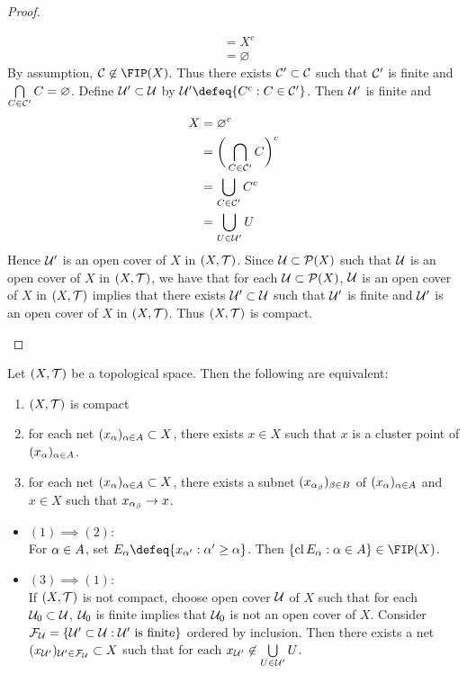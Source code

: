 \documentclass{book}
\begin{document}
\begin{proof}
\begin{itemize}
\begin{align*}
				& = X^c \\
				& = \varnothing
			\end{align*}  
			By assumption, $\MC \not \in \FIP(X)$. Thus there exists $\mathcal{C}' \subset \mathcal{C}$ such that $\mathcal{C}'$ is finite and $\bigcap\limits_{C \in \mathcal{C}'} C = \varnothing$. Define $\mathcal{U}' \subset \mathcal{U}$ by $\MU' \defeq \{C^c: C \in \MC' \}$. Then $\mathcal{U}'$ is finite and 
			\begin{align*}
				X
				& = \varnothing^c \\
				& = \bigg( \bigcap_{C \in \mathcal{C}'} C \bigg)^c \\
				& = \bigcup_{C \in \mathcal{C}'} C^c \\
				& = \bigcup_{U \in \mathcal{U}'} U \\
			\end{align*}
			Hence $\mathcal{U}'$ is an open cover of $X$ in $(X, \mathcal{T})$. Since $\mathcal{U} \subset \mathcal{P}(X)$ such that $\mathcal{U}$ is an open cover of $X$ in $(X, \mathcal{T})$, we have that for each $\mathcal{U} \subset \mathcal{P}(X)$, $\mathcal{U}$ is an open cover of $X$ in $(X, \mathcal{T})$ implies that there exists $\mathcal{U}' \subset \mathcal{U}$ such that $\mathcal{U}'$ is finite and $\mathcal{U}'$ is an open cover of $X$ in $(X, \mathcal{T})$. Thus $(X, \mathcal{T})$ is compact. 
			\end{itemize}
	\end{proof}

	\begin{ex} 
		Let $(X, \mathcal{T})$ be a topological space. Then the following are equivalent:
		\begin{enumerate}
			\item $(X, \mathcal{T})$ is compact
			\item for each net $(x_{\alpha})_{\alpha \in A} \subset X$, there exists $x \in X$ such that $x$ is a cluster point of $(x_{\alpha})_{\alpha \in A}$.
			\item for each net $(x_{\alpha})_{\alpha \in A} \subset X$, there exists a subnet $(x_{\alpha_{\beta}})_{\beta \in B}$ of $(x_{\alpha})_{\alpha \in A}$ and $x \in X$ such that $x_{\alpha_{\beta}} \rightarrow x$. \\
		\end{enumerate} 
		\begin{itemize}
			\item $(1) \implies (2)$: \\
			For $\alpha \in A$, set $E_{\al} \defeq \{x_{\al'}: \al' \geq \al \}$. Then $\{\cl E_{\al}: \al \in A\} \in \FIP(X)$.  
			\item $(3) \implies (1)$: \\
			If $(X, \mathcal{T})$ is not compact, choose open cover $\mathcal{U}$ of $X$ such that for each $\mathcal{U}_0 \subset \mathcal{U}$, $\mathcal{U}_0$ is finite implies that $\mathcal{U}_0$ is not an open cover of $X$. Consider $\mathcal{F}_{\mathcal{U}} = \{\mathcal{U}' \subset \mathcal{U}: \mathcal{U}' \text{ is finite}\}$ ordered by inclusion. Then there exists a net $(x_{\mathcal{U}'})_{\mathcal{U}' \in \mathcal{F}_{\mathcal{U}}} \subset X$ such that for each $x_{\mathcal{U}'} \not \in  \bigcup\limits_{U \in \mathcal{U}'} U$. 
		\end{itemize}
	\end{ex}
	
\end{document}
